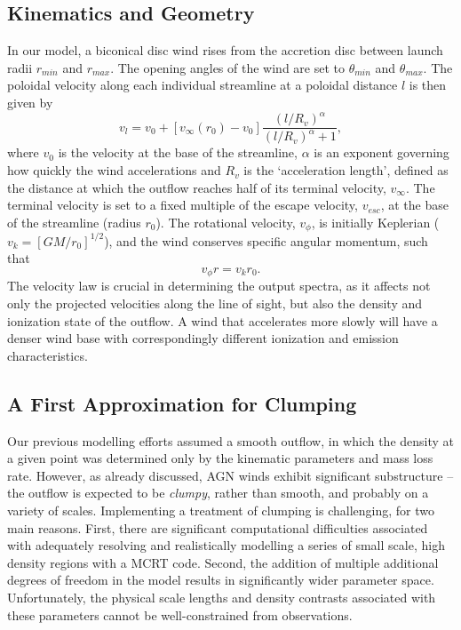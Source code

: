\documentclass[useAMS,usenatbib]{mn2e_x}
\begin{document}
\subsection{Kinematics and Geometry}

In our model, a biconical disc wind rises from the accretion 
disc between launch radii $r_{min}$ and $r_{max}$.
The opening angles of the wind are set to $\theta_{min}$ and $\theta_{max}$.
The poloidal velocity along each individual streamline at a poloidal distance $l$ 
is then given by
\begin{equation}
v_l=v_0+\left[v_{\infty}(r_0)-v_0\right]\frac{\left(l/R_v\right)^{\alpha}}{\left(l/R_v\right)^{\alpha}+1},
\label{v_law}
\end{equation}
where $v_0$ is the velocity at the base of the streamline, $\alpha$ is
an exponent governing how quickly the wind accelerations and 
$R_v$ is the `acceleration length', defined as the distance at which
the outflow reaches half of its terminal velocity, $v_{\infty}$.
The terminal velocity is set to a fixed multiple of the escape
velocity, $v_{esc}$, at the base of the streamline (radius $r_0$).
The rotational velocity, $v_{\phi}$, is initially Keplerian ($v_k = [GM/r_0]^{1/2}$),
and the wind conserves specific angular momentum, such that 
\begin{equation}
v_{\phi} r = v_k r_0.
\label{v_law}
\end{equation}
The velocity law is crucial in determining the output spectra,
as it affects not only the projected velocities along the line of sight,
but also the density and ionization state of the outflow.
A wind that accelerates more slowly will have a denser wind base
with correspondingly different ionization and emission characteristics.

\subsection{A First Approximation for Clumping}

Our previous modelling efforts assumed a smooth outflow, 
in which the density at a given point was determined only by the 
kinematic parameters and mass loss rate. However, as already discussed,
AGN winds exhibit significant substructure -- the outflow is expected to be
{\em clumpy}, rather than smooth, and probably on a variety of scales. 
Implementing a treatment of clumping is challenging, for
two main reasons. First, there are significant 
computational difficulties associated with adequately
resolving and realistically modelling a series of small scale, high density
regions with a MCRT code. Second, the addition of multiple additional degrees of
freedom in the model results in significantly wider parameter space.
Unfortunately, the physical scale lengths and density contrasts 
associated with these parameters cannot be well-constrained from observations.
\end{document}
